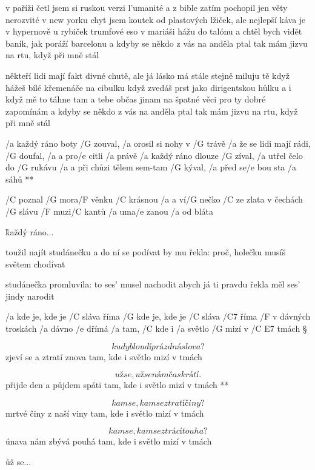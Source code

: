 v paříži četl jsem si ruskou verzi l'umanité
a z bible zatím pochopil jen věty nerozvité
v new yorku chyt jsem koutek od plastových lžiček, ale
nejlepší káva je v hypernově u rybiček
trumfové eso v mariáši hážu do talónu
a chtěl bych vidět baník, jak poráží barcelonu
a kdyby se někdo z vás na anděla ptal
tak mám jizvu na rtu, když při mně stál \s

někteří lidi mají fakt divné chutě, ale
já lásko má stále stejně miluju tě
když hážeš bílé křemenáče na cibulku
když zvedáš prst jako dirigentskou hůlku
a i když mě to táhne tam a tebe občas jinam
na špatné věci pro ty dobré zapomínám
a kdyby se někdo z vás na anděla ptal
tak mám jizvu na rtu, když při mně stál





\R  /a každý ráno boty /G zouval,  /a orosil si nohy v /G trávě
    /a že se lidi mají rádi, /G doufal, /a a pro/e citli /a právě
    /a každý ráno dlouze /G zíval, /a utřel čelo do /G rukávu
    /a a při chůzi tělem sem-tam /G kýval, /a před se/e bou sta /a sáhů **

/C poznal /G mora/F věnku /C krásnou
/a a ví/G nečko /C ze zlata
v čechách /G slávu /F muzi/C kantů
/a uma/e zanou /a od bláta

\r  každý ráno...

toužil najít studánečku
a do ní se podívat
by mu řekla: proč, holečku
musíš světem chodívat \s

studánečka promluvila:
to ses' musel nachodit
abych já ti pravdu řekla
měl ses' jindy narodit

\rr




/a kde je, kde je /C sláva říma
/G kde je, kde je /C sláva /C7 říma
/F v dávných troskách /a dávno /e dřímá
/a tam, /C kde i /a světlo /G mizí v /{C E7} tmách \S

\[ kudy bloudí prázdná slova? \]
zjeví se a ztratí znova
tam, kde i světlo mizí v tmách \s

\R \[ už se, už se nám čas krátí. \]
   přijde den a půjdem spáti
   tam, kde i světlo mizí v tmách **

\[ kam se, kam se ztratí činy? \]
mrtvé činy z naší viny
tam, kde i světlo mizí v tmách \s

\[ kam se, kam se ztrácí touha? \]
únava nám zbývá pouhá
tam, kde i světlo mizí v tmách \s

\r už se...

